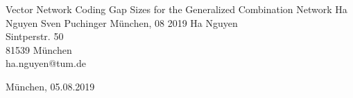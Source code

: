 \documentclass{CODthesis}
\theoremstyle{definition}
\theoremstyle{plain}
\theoremstyle{remark}
\theoremstyle{plain}
\theoremstyle{definition}
\theoremstyle{plain}
\theoremstyle{plain}
\begin{document}
    {Vector Network Coding Gap Sizes for the Generalized Combination Network}                  %
    {Ha Nguyen}                  %
    {Sven Puchinger}            %
    {M\"unchen, 08 2019}          %
    {Ha Nguyen\\                 %
    Sintperstr. 50\\
    81539 M\"unchen\\
    ha.nguyen@tum.de}

    {M\"unchen, 05.08.2019}         %

\cleardoubleemptypage   %


    \setcounter{page}{1}

        \tableofcontents    %
        \listoffigures      %
        \listoftables       %
        \cleardoubleemptypage   %


    \setcounter{page}{1}

	
	
	
	
    
    
    
        
        \cleardoubleemptypage



    \appendix
    \setcounter{page}{1}
       

        
        
\end{document}
